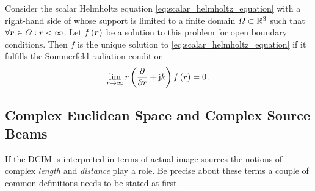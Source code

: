 
\begin{theorem}
	\label{sommerfeld_radiation_condition}
	Consider the scalar Helmholtz equation \eqref{eq:scalar_helmholtz_equation}
	with a right-hand side of whose support is limited to a finite domain
	$\Omega \subset \mathbb{R}^3$ such that $\forall \pvec{r} \in \Omega: r < \infty$.
	Let $f \left( \pvec{r} \right)$ be a solution to this problem for open 
	boundary conditions.
	Then $f$ is the unique solution to \eqref{eq:scalar_helmholtz_equation}
	if it fulfills the Sommerfeld radiation condition 
	\begin{equation}
		\lim_{r \to \infty}
		r \left( \frac{\partial}{\partial r} + \mathrm{j} k \right) f \left( r \right) = 0 \, .
	\end{equation}
\end{theorem}










\subsection{Complex Euclidean Space and Complex Source Beams}

If the \ac{DCIM} is interpreted in terms of actual image sources the notions
of complex \emph{length} and \emph{distance} play a role.
Be precise about these terms a couple of common definitions
\cite{pohl2020, heuser2006}
needs to be stated at first.

